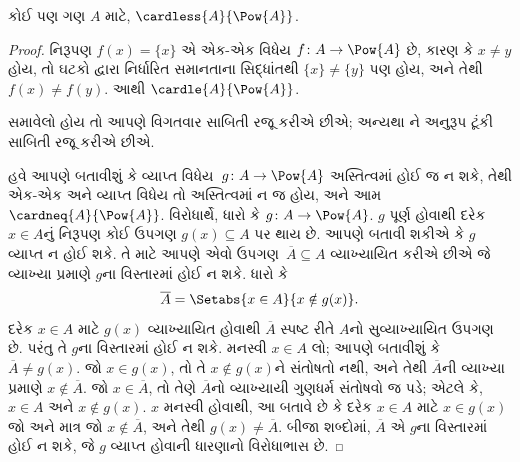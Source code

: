 \begin{thm}[કૅન્ટૉર]
કોઈ પણ ગણ $A$ માટે, $\cardless{A}{\Pow{A}}$.
\end{thm}

\begin{proof}
નિરૂપણ $f(x) = \{x\}$ એ એક-એક વિધેય $f \colon A \to \Pow{A}$
છે, કારણ કે $x \neq y$ હોય, તો ઘટકો દ્વારા નિર્ધારિત સમાનતાના
સિદ્ધાંતથી $\{x\} \neq \{y\}$ પણ હોય, અને તેથી $f(x) \neq f(y)$.
આથી $\cardle{A}{\Pow{A}}$.

\begin{editorial}
 સમાવેલો હોય તો આપણે વિગતવાર સાબિતી રજૂ કરીએ છીએ;
અન્યથા ને અનુરૂપ ટૂંકી સાબિતી રજૂ કરીએ છીએ.
\end{editorial}

%
  હવે આપણે બતાવીશું કે વ્યાપ્ત વિધેય~$g\colon A \to
  \Pow{A}$ અસ્તિત્વમાં હોઈ જ ન શકે, તેથી એક-એક અને વ્યાપ્ત વિધેય તો
  અસ્તિત્વમાં ન જ હોય, અને આમ $\cardneq{A}{\Pow{A}}$. વિરોધાર્થે,
  ધારો કે $g\colon A \to \Pow{A}$. $g$ પૂર્ણ હોવાથી દરેક
  $x \in A$નું નિરૂપણ કોઈ ઉપગણ $g(x) \subseteq A$ પર થાય છે.
  આપણે બતાવી શકીએ કે $g$ વ્યાપ્ત ન હોઈ શકે. તે માટે આપણે એવો
  ઉપગણ~$\overline{A} \subseteq A$ વ્યાખ્યાયિત કરીએ છીએ જે
  વ્યાખ્યા પ્રમાણે $g$ના વિસ્તારમાં હોઈ ન શકે. ધારો કે
  \[
  \overline{A} = \Setabs{x \in A}{x \notin g(x)}.
  \]
  દરેક $x \in A$ માટે $g(x)$ વ્યાખ્યાયિત હોવાથી $\overline{A}$
  સ્પષ્ટ રીતે $A$નો સુવ્યાખ્યાયિત ઉપગણ છે. પરંતુ તે $g$ના વિસ્તારમાં
  હોઈ ન શકે. મનસ્વી $x \in A$ લો; આપણે બતાવીશું કે
  $\overline{A} \neq g(x)$. જો $x \in g(x)$, તો તે
  $x \notin g(x)$ને સંતોષતો નથી, અને તેથી $\overline{A}$ની વ્યાખ્યા
  પ્રમાણે $x \notin \overline{A}$. જો $x \in \overline{A}$, તો
  તેણે $\overline{A}$નો વ્યાખ્યાયી ગુણધર્મ સંતોષવો જ પડે; એટલે કે,
  $x \in A$ અને $x \notin g(x)$. $x$ મનસ્વી હોવાથી, આ બતાવે છે કે
  દરેક $x \in A$ માટે $x \in g(x)$ જો અને માત્ર જો
  $x \notin \overline{A}$, અને તેથી $g(x) \neq \overline{A}$.
  બીજા શબ્દોમાં, $\overline{A}$ એ $g$ના વિસ્તારમાં હોઈ ન શકે, જે
  $g$ વ્યાપ્ત હોવાની ધારણાનો વિરોધાભાસ છે.
\end{proof}

